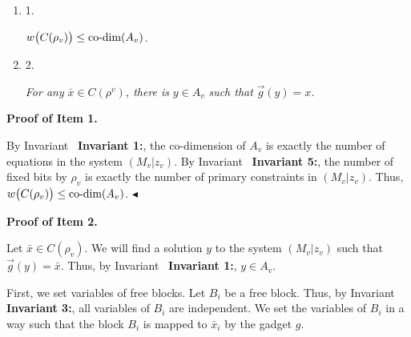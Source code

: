 \begin{enumerate}


\item[] 
1. 


$w\bigl{(}C(\rho_{v})\bigr{)}\leq\text{co-dim}(A_{v})$\emph{.}\par





\item[] 
2. 


\emph{For any }$\bar{x}\in C(\rho^{v})$\emph{, there is }$y\in A_{v}$\emph{ such that }$\overrightarrow{g}(y)=x$\emph{.}\par





\end{enumerate}






\par\medskip\noindent\textbf{Proof of Item 1.}\par




By Invariant \textbf{ Invariant 1:}, the co-dimension of $A_{v}$ is exactly the number of equations in the system $(M_{v}|z_{v})$.
By Invariant \textbf{ Invariant 5:}, the number of fixed bits by $\rho_{v}$ is exactly the number of primary constraints in $(M_{v}|z_{v})$.
Thus, $w\bigl{(}C(\rho_{v})\bigr{)}\leq\text{co-dim}(A_{v})$.
$\blacktriangleleft$\par





\par\medskip\noindent\textbf{Proof of Item 2.}\par




Let $\bar{x}\in C(\rho_{v})$.
We will find a solution $y$ to the system $(M_{v}|z_{v})$ such that $\overrightarrow{g}(y)=\bar{x}$.
Thus, by Invariant \textbf{ Invariant 1:}, $y\in A_{v}$.\par




First, we set variables of free blocks.
Let $B_{i}$ be a free block.
Thus, by Invariant \textbf{ Invariant 3:}, all variables of $B_{i}$ are independent.
We set the variables of $B_{i}$ in a way such that the block $B_{i}$ is mapped to $\bar{x}_{i}$ by the gadget $g$.\par




